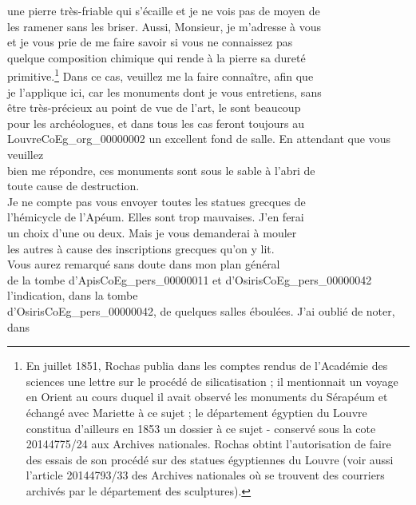 \documentclass{book}
\begin{document}
une pierre très-friable qui s’écaille et je ne vois pas de moyen de\\
les ramener sans les briser. Aussi, Monsieur, je m’adresse à vous\\
et je vous prie de me faire savoir si vous ne connaissez pas\\
quelque composition chimique qui rende à la pierre sa dureté\\
primitive.\footnote{En juillet 1851, Rochas publia dans les comptes rendus de l'Académie des sciences une lettre sur le procédé de silicatisation ; il mentionnait un voyage en Orient au cours duquel il avait observé les monuments du Sérapéum et échangé avec Mariette à ce sujet ; le département égyptien du Louvre constitua d'ailleurs en 1853 un dossier à ce sujet - conservé sous la cote 20144775/24 aux Archives nationales. Rochas obtint l'autorisation de faire des essais de son procédé sur des statues égyptiennes du Louvre (voir aussi l'article 20144793/33 des Archives nationales où se trouvent des courriers archivés par le département des sculptures).} Dans ce cas, veuillez me la faire connaître, afin que\\
je l’applique ici, car les monuments dont je vous entretiens, sans\\
être très-précieux au point de vue de l’art, le sont beaucoup\\
pour les archéologues, et dans tous les cas feront toujours au\\
Louvre\gls{CoEg_org_00000002} un excellent fond de salle. En attendant que vous veuillez\\
bien me répondre, ces monuments sont sous le sable à l’abri de\\
toute cause de destruction.\\
\indent Je ne compte pas vous envoyer toutes les statues grecques de\\
l’hémicycle de l’Apéum. Elles sont trop mauvaises. J’en ferai\\
un choix d’une ou deux. Mais je vous demanderai à mouler\\
les autres à cause des inscriptions grecques qu’on y lit.\\
\indent Vous aurez remarqué sans doute dans mon plan général\\
de la tombe d’Apis\gls{CoEg_pers_00000011} et d’Osiris\gls{CoEg_pers_00000042} l’indication, dans la tombe\\
d’Osiris\gls{CoEg_pers_00000042}, de quelques salles éboulées. J’ai oublié de noter, dans\\
\end{document}
